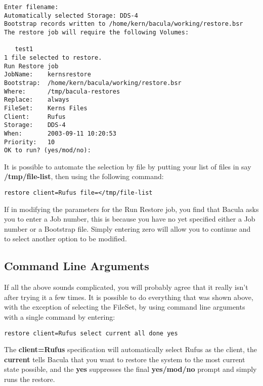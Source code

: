 \footnotesize
\begin{verbatim}
Enter filename:
Automatically selected Storage: DDS-4
Bootstrap records written to /home/kern/bacula/working/restore.bsr
The restore job will require the following Volumes:
   
   test1
1 file selected to restore.
Run Restore job
JobName:    kernsrestore
Bootstrap:  /home/kern/bacula/working/restore.bsr
Where:      /tmp/bacula-restores
Replace:    always
FileSet:    Kerns Files
Client:     Rufus
Storage:    DDS-4
When:       2003-09-11 10:20:53
Priority:   10
OK to run? (yes/mod/no):
\end{verbatim}
\normalsize

It is possible to automate the selection by file by putting your list of files
in say {\bf /tmp/file-list}, then using the following command: 

\footnotesize
\begin{verbatim}
restore client=Rufus file=</tmp/file-list
\end{verbatim}
\normalsize

If in modifying the parameters for the Run Restore job, you find that Bacula
asks you to enter a Job number, this is because you have no yet specified
either a Job number or a Bootstrap file. Simply entering zero will allow you
to continue and to select another option to be modified. 
\label{CommandArguments}

\subsection*{Command Line Arguments}

If all the above sounds complicated, you will probably agree that it really
isn't after trying it a few times. It is possible to do everything that was
shown above, with the exception of selecting the FileSet, by using command
line arguments with a single command by entering: 

\footnotesize
\begin{verbatim}
restore client=Rufus select current all done yes
\end{verbatim}
\normalsize

The {\bf client=Rufus} specification will automatically select Rufus as the
client, the {\bf current} tells Bacula that you want to restore the system to
the most current state possible, and the {\bf yes} suppresses the final {\bf
yes/mod/no} prompt and simply runs the restore. 

